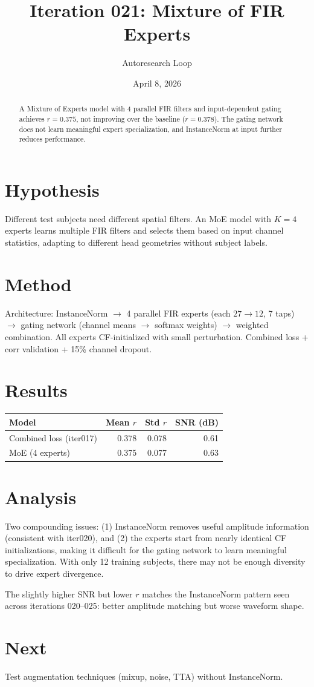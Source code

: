 \documentclass[11pt,a4paper]{article}
\title{Iteration 021: Mixture of FIR Experts}
\author{Autoresearch Loop}
\date{April 8, 2026}
\begin{document}
\maketitle

\begin{abstract}
A Mixture of Experts model with 4 parallel FIR filters and input-dependent
gating achieves $r=0.375$, not improving over the baseline ($r=0.378$).
The gating network does not learn meaningful expert specialization, and
InstanceNorm at input further reduces performance.
\end{abstract}

\section{Hypothesis}
Different test subjects need different spatial filters. An MoE model with
$K=4$ experts learns multiple FIR filters and selects them based on input
channel statistics, adapting to different head geometries without subject labels.

\section{Method}
Architecture: InstanceNorm $\to$ 4 parallel FIR experts (each $27 \to 12$,
7 taps) $\to$ gating network (channel means $\to$ softmax weights) $\to$
weighted combination. All experts CF-initialized with small perturbation.
Combined loss + corr validation + 15\% channel dropout.

\section{Results}
\begin{table}[H]
\centering
\begin{tabular}{lrrr}
\toprule
Model & Mean $r$ & Std $r$ & SNR (dB) \\
\midrule
Combined loss (iter017) & 0.378 & 0.078 & 0.61 \\
MoE (4 experts) & 0.375 & 0.077 & 0.63 \\
\bottomrule
\end{tabular}
\end{table}

\section{Analysis}
Two compounding issues: (1) InstanceNorm removes useful amplitude information
(consistent with iter020), and (2) the experts start from nearly identical
CF initializations, making it difficult for the gating network to learn
meaningful specialization. With only 12 training subjects, there may not be
enough diversity to drive expert divergence.

The slightly higher SNR but lower $r$ matches the InstanceNorm pattern seen
across iterations 020--025: better amplitude matching but worse waveform shape.

\section{Next}
Test augmentation techniques (mixup, noise, TTA) without InstanceNorm.
\end{document}
